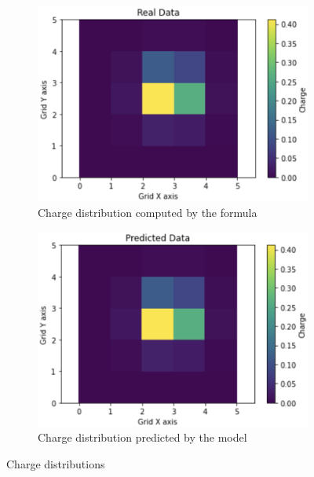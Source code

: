 \documentclass{article}
\begin{document}
\begin{figure}[H]
\centering
\begin{subfigure}{.5\textwidth}
  \centering
  \includegraphics[width=.9\linewidth]{images/real.png}
  \caption{Charge distribution computed by the formula}
  \label{fig:sub1}
\end{subfigure}%
\begin{subfigure}{.5\textwidth}
  \centering
  \includegraphics[width=.9\linewidth]{images/predicted.png}
  \caption{Charge distribution predicted by the model}
  \label{fig:sub2}
\end{subfigure}
\caption{Charge distributions}
\label{fig:model}
\end{figure}
\end{document}

